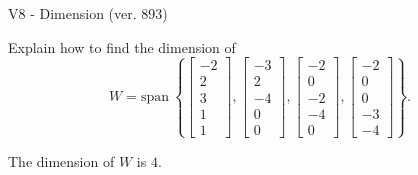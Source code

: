 \begin{exercise}
  \begin{exerciseTitle}V8 - Dimension (ver. 893)\end{exerciseTitle}
  \begin{exerciseStatement}
    Explain how to find the dimension of 
\[W=\mathrm{span}\ \left\{\left[\begin{array}{r}
-2 \\
2 \\
3 \\
1 \\
1
\end{array}\right] , \left[\begin{array}{r}
-3 \\
2 \\
-4 \\
0 \\
0
\end{array}\right] , \left[\begin{array}{r}
-2 \\
0 \\
-2 \\
-4 \\
0
\end{array}\right] , \left[\begin{array}{r}
-2 \\
0 \\
0 \\
-3 \\
-4
\end{array}\right]\right\}.\]



  \end{exerciseStatement}
  \begin{exerciseAnswer}
   The dimension of \(W\) is  \(4\).
  


  \end{exerciseAnswer}
\end{exercise}